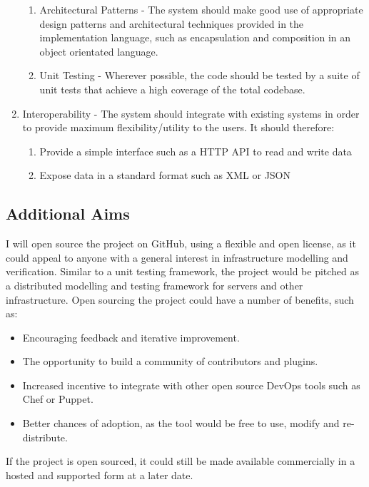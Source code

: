 \documentclass{cshonours}
\begin{document}
\begin{enumerate}
\begin{enumerate}
      \item Architectural Patterns - The system should make good use of appropriate design patterns and architectural techniques provided in the implementation language, such as encapsulation and composition in an object orientated language.
      \item Unit Testing - Wherever possible, the code should be tested by a suite of unit tests that achieve a high coverage of the total codebase.
    \end{enumerate}
  \item Interoperability - The system should integrate with existing systems in order to provide maximum flexibility/utility to the users. It should therefore:
    \begin{enumerate}
      \item Provide a simple interface such as a HTTP API to read and write data
      \item Expose data in a standard format such as XML or JSON
    \end{enumerate}
\end{enumerate}

\subsection{Additional Aims}

I will open source the project on GitHub, using a flexible and open license, as it could appeal to anyone with a general interest in infrastructure modelling and verification. Similar to a unit testing framework, the project would be pitched as a distributed modelling and testing framework for servers and other infrastructure. Open sourcing the project could have a number of benefits, such as:

\begin{itemize}
  \item Encouraging feedback and iterative improvement.
  \item The opportunity to build a community of contributors and plugins.
  \item Increased incentive to integrate with other open source DevOps tools such as Chef or Puppet.
  \item Better chances of adoption, as the tool would be free to use, modify and re-distribute.
\end{itemize}

If the project is open sourced, it could still be made available commercially in a hosted and supported form at a later date.
\end{document}
